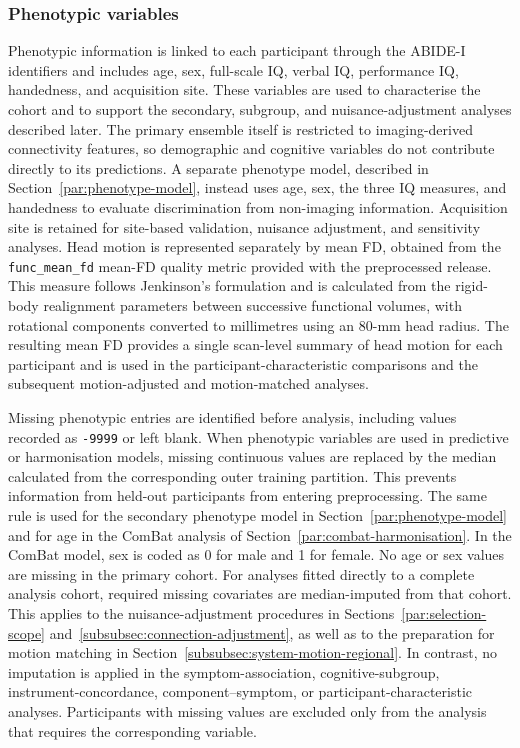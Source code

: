 \subsubsection{Phenotypic variables}
\label{subsubsec:phenotypic-variables}

Phenotypic information is linked to each participant through the ABIDE-I identifiers and
includes age, sex, full-scale IQ, verbal IQ, performance IQ, handedness, and acquisition
site. These variables are used to characterise the cohort and to support the secondary,
subgroup, and nuisance-adjustment analyses described later. The primary ensemble itself is
restricted to imaging-derived connectivity features, so demographic and cognitive variables
do not contribute directly to its predictions. A separate phenotype model, described in
Section~\ref{par:phenotype-model}, instead uses age, sex, the three IQ measures, and handedness to
evaluate discrimination from non-imaging information. Acquisition site is retained for
site-based validation, nuisance adjustment, and sensitivity analyses. Head motion is represented separately by mean FD, obtained from
the \texttt{func\_mean\_fd} mean-FD quality metric provided with the preprocessed release. This
measure follows Jenkinson's formulation and is calculated from the rigid-body realignment
parameters between successive functional volumes, with rotational components converted to
millimetres using an 80-mm head radius. The resulting mean FD
provides a single scan-level summary of head motion for each participant and is used in the
participant-characteristic comparisons and the subsequent motion-adjusted and
motion-matched analyses.

Missing phenotypic entries are identified before analysis, including values recorded as
\texttt{-9999} or left blank. When phenotypic variables are used in predictive or
harmonisation models, missing continuous values are replaced by the median calculated from
the corresponding outer training partition. This prevents information from held-out
participants from entering preprocessing. The same rule is used for the secondary
phenotype model in Section~\ref{par:phenotype-model} and for age in the ComBat analysis of
Section~\ref{par:combat-harmonisation}. In the ComBat model, sex is coded as 0 for male and 1 for female.
No age or sex values are missing in the primary cohort. For analyses fitted directly to a complete analysis cohort, required missing covariates are
median-imputed from that cohort. This applies to the nuisance-adjustment procedures in
Sections~\ref{par:selection-scope} and~\ref{subsubsec:connection-adjustment}, as well as to the preparation for motion
matching in Section~\ref{subsubsec:system-motion-regional}. In contrast, no imputation is applied in the
symptom-association, cognitive-subgroup, instrument-concordance, component--symptom, or
participant-characteristic analyses. Participants with missing values are excluded only
from the analysis that requires the corresponding variable.

